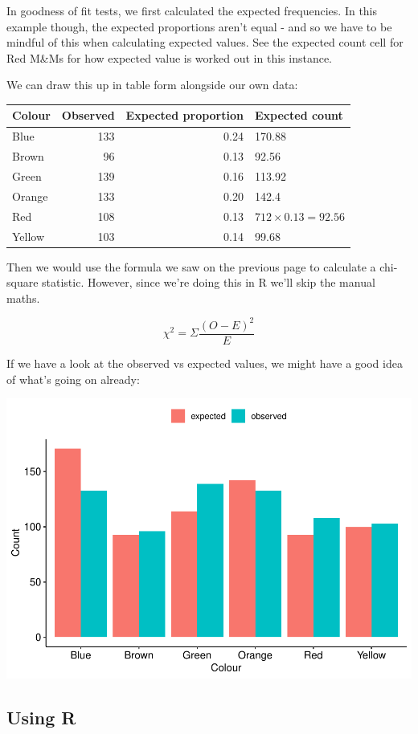 \documentclass[
]{book}
\begin{document}
In goodness of fit tests, we first calculated the expected frequencies. In this example though, the expected proportions aren't equal - and so we have to be mindful of this when calculating expected values. See the expected count cell for Red M\&Ms for how expected value is worked out in this instance.

We can draw this up in table form alongside our own data:

\begin{tabular}{l|r|r|l}
\hline
Colour & Observed & Expected proportion & Expected count\\
\hline
Blue & 133 & 0.24 & 170.88\\
\hline
Brown & 96 & 0.13 & 92.56\\
\hline
Green & 139 & 0.16 & 113.92\\
\hline
Orange & 133 & 0.20 & 142.4\\
\hline
Red & 108 & 0.13 & $712 \times 0.13 = 92.56$\\
\hline
Yellow & 103 & 0.14 & 99.68\\
\hline
\end{tabular}

Then we would use the formula we saw on the previous page to calculate a chi-square statistic. However, since we're doing this in R we'll skip the manual maths.

\[
\chi^2 = \Sigma \frac{(O-E)^2}{E}
\]

If we have a look at the observed vs expected values, we might have a good idea of what's going on already:

\includegraphics{_main_files/figure-latex/unnamed-chunk-116-1.pdf}

\subsection{Using R}\label{using-r}
\end{document}

